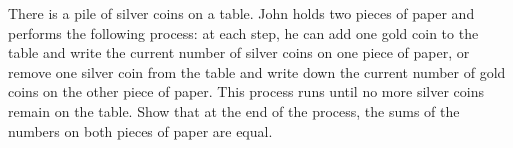 \begin{problem}
    There is a pile of silver coins on a table. John holds two pieces of paper and performs the following process: at each step, he can add one gold coin to the table and write the current number of silver coins on one piece of paper, or remove one silver coin from the table and write down the current number of gold coins on the other piece of paper. This process runs until no more silver coins remain on the table. Show that at the end of the process, the sums of the numbers on both pieces of paper are equal.
\end{problem}

